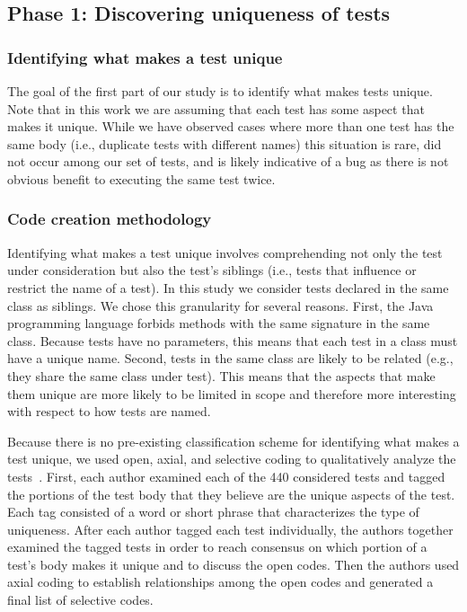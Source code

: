 \subsection{Phase 1: Discovering uniqueness of tests}

\subsubsection{Identifying what makes a test unique}

The goal of the first part of our study is to identify what makes tests unique.
%
Note that in this work we are assuming that each test has some aspect that makes it unique.
%
While we have observed cases where more than one test has the same body (i.e., duplicate tests with different names) this situation is rare, did not occur among our set of tests, and is likely indicative of a bug as there is not obvious benefit to executing the same test twice.

\subsubsection{Code creation methodology}

Identifying what makes a test unique involves comprehending not only the test under consideration but also the test’s siblings (i.e., tests that influence or restrict the name of a test).
%
In this study we consider tests declared in the same class as siblings. We chose this granularity for several reasons.
%
First, the Java programming language forbids methods with the same signature in the same class.
%
Because tests have no parameters, this means that each test in a class must have a unique name.
%
Second, tests in the same class are likely to be related (e.g., they share the same class under test).
%
This means that the aspects that make them unique are more likely to be limited in scope and therefore more interesting with respect to how tests are named.

Because there is no pre-existing classification scheme for identifying what makes a test unique, we used open, axial, and selective coding to qualitatively analyze the tests~\cite{glaser1967discovery,strauss1998basics}.
%
First, each author examined each of the \num{440} considered tests and tagged the portions of the test body that they believe are the unique aspects of the test.
%
Each tag consisted of a word or short phrase that characterizes the type of uniqueness.
%
After each author tagged each test individually, the authors together examined the tagged tests in order to reach consensus on which portion of a test’s body makes it unique and to discuss the open codes.
%
Then the authors used axial coding to establish relationships among the open codes and generated a final list of selective codes.

